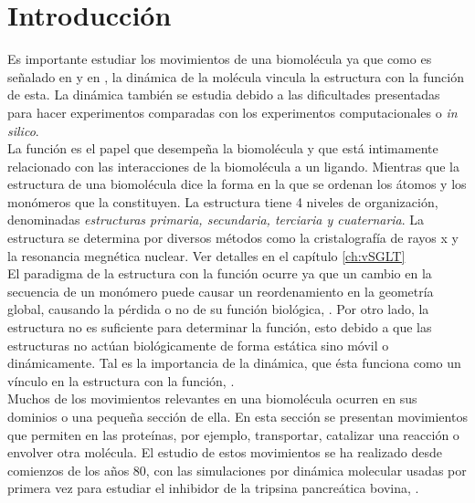 \chapter*{Introducci\'{o}n}
Es importante estudiar los movimientos de una biomol\'{e}cula ya que como es se\~{n}alado en \cite{Lezon2009} y en  \cite{Rader2006}, la din\'{a}mica de la mol\'{e}cula vincula la estructura con la funci\'{o}n de esta. La din\'{a}mica tambi\'{e}n se estudia debido a las dificultades presentadas para hacer experimentos comparadas con los experimentos computacionales o \textit{in silico}.\\

La funci\'{o}n es el papel que desempe\~{n}a la biomol\'{e}cula y que est\'{a} intimamente relacionado con las interacciones de la biomol\'{e}cula a un ligando. Mientras que la estructura de una biomol\'{e}cula dice la forma en la que se ordenan los \'{a}tomos y los mon\'{o}meros que la constituyen. La estructura tiene 4 niveles de organizaci\'{o}n, denominadas \textit{estructuras primaria, secundaria, terciaria y cuaternaria}. La estructura se determina por diversos m\'{e}todos como la cristalograf\'{i}a de rayos x y la resonancia megn\'{e}tica nuclear. Ver detalles en el cap\'{i}tulo \ref{ch:vSGLT} \\

El paradigma de la estructura con la funci\'{o}n ocurre ya que un cambio en la secuencia de un mon\'{o}mero puede causar un reordenamiento en la geometr\'{i}a global, causando la p\'{e}rdida o no de su funci\'{o}n biol\'{o}gica, \cite{Dykeman2010NormalPhysics}. Por otro lado, la estructura no es suficiente para determinar la funci\'{o}n, esto debido a que las estructuras no act\'{u}an biol\'{o}gicamente de forma est\'{a}tica sino m\'{o}vil o din\'{a}micamente. Tal es  la importancia de la din\'{a}mica, que \'{e}sta funciona como un v\'{i}nculo en la estructura con la funci\'{o}n, \cite{Bahar2005Coarse-grainedBiology}.\\


Muchos de los movimientos relevantes en una biomol\'{e}cula ocurren en sus dominios o una peque\~{n}a secci\'{o}n de ella. En esta secci\'{o}n se presentan movimientos que 
permiten en las prote\'{i}nas, por ejemplo, transportar, catalizar una reacci\'{o}n o envolver otra mol\'{e}cula. El estudio de estos movimientos se ha realizado desde comienzos de los a\~{n}os 80, con las simulaciones por din\'{a}mica molecular usadas por primera vez para estudiar el inhibidor de la tripsina pancre\'{a}tica bovina,  \cite{Bahar2005Coarse-grainedBiology}.\\

